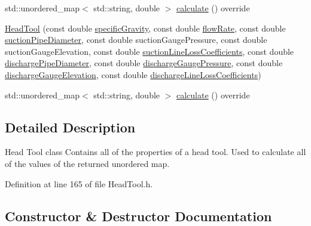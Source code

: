 \begin{DoxyCompactItemize}
std\+::unordered\+\_\+map$<$ std\+::string, double $>$ \hyperlink{class_head_tool_a146eaf45d39cf6d691fa10b4b80b5e9e}{calculate} () override
\item 
\hyperlink{class_head_tool_a9934c87c8f8eb515ff32e46c74004c0e}{Head\+Tool} (const double \hyperlink{class_head_tool_base_ae5af2380fb5db2c25281ef663a5fb65f}{specific\+Gravity}, const double \hyperlink{class_head_tool_base_acf4c03cb62cbf63aba017ce063989fbc}{flow\+Rate}, const double \hyperlink{class_head_tool_base_a357365fc5ef346ce7bcb089c9d1a95e1}{suction\+Pipe\+Diameter}, const double suction\+Gauge\+Pressure, const double suction\+Gauge\+Elevation, const double \hyperlink{class_head_tool_base_ac74c6f6f8ab387efe7b77e0ce6ecd84e}{suction\+Line\+Loss\+Coefficients}, const double \hyperlink{class_head_tool_base_a126a397bd3d87b68864e1962c70bb45e}{discharge\+Pipe\+Diameter}, const double \hyperlink{class_head_tool_base_a39c854f13b16967e02a67cd1aaee07c4}{discharge\+Gauge\+Pressure}, const double \hyperlink{class_head_tool_base_a9ed2160992f8da2e335d919cf9aedd08}{discharge\+Gauge\+Elevation}, const double \hyperlink{class_head_tool_base_a147c035c7422406c594c5fd42ab11eb0}{discharge\+Line\+Loss\+Coefficients})
\item 
std\+::unordered\+\_\+map$<$ std\+::string, double $>$ \hyperlink{class_head_tool_a146eaf45d39cf6d691fa10b4b80b5e9e}{calculate} () override
\end{DoxyCompactItemize}


\subsection{Detailed Description}
Head Tool class Contains all of the properties of a head tool. Used to calculate all of the values of the returned unordered map. 

Definition at line 165 of file Head\+Tool.\+h.



\subsection{Constructor \& Destructor Documentation}
\mbox{\label{class_head_tool_a9934c87c8f8eb515ff32e46c74004c0e}} 
